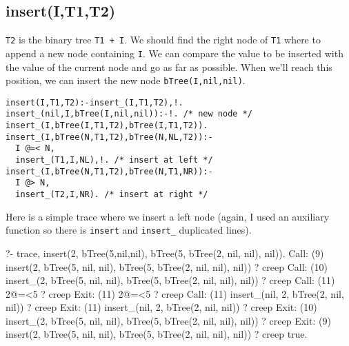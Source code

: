 \documentclass{article}
\begin{document}
  \subsection*{insert(I,T1,T2)}

    \texttt{T2} is the binary tree \texttt{T1 + I}.
    We should find the right node of \texttt{T1} where to append a new node
    containing \texttt{I}. We can compare the value to be inserted with the value of the current node
    and go as far as possible. When we'll reach this position, we can insert the new node \texttt{bTree(I,nil,nil)}.
    \begin{verbatim}
insert(I,T1,T2):-insert_(I,T1,T2),!.
insert_(nil,I,bTree(I,nil,nil)):-!. /* new node */
insert_(I,bTree(I,T1,T2),bTree(I,T1,T2)).
insert_(I,bTree(N,T1,T2),bTree(N,NL,T2)):-
  I @=< N,
  insert_(T1,I,NL),!. /* insert at left */
insert_(I,bTree(N,T1,T2),bTree(N,T1,NR)):-
  I @> N,
  insert_(T2,I,NR). /* insert at right */
    \end{verbatim}

    Here is a simple trace where we insert a left node (again, I used an auxiliary function so there is \texttt{insert} and \texttt{insert_} duplicated lines).
    \begin{myminted}
    ?- trace, insert(2, bTree(5,nil,nil), bTree(5, bTree(2, nil, nil), nil)).
   Call: (9) insert(2, bTree(5, nil, nil), bTree(5, bTree(2, nil, nil), nil)) ? creep
   Call: (10) insert_(2, bTree(5, nil, nil), bTree(5, bTree(2, nil, nil), nil)) ? creep
   Call: (11) 2@=<5 ? creep
   Exit: (11) 2@=<5 ? creep
   Call: (11) insert_(nil, 2, bTree(2, nil, nil)) ? creep
   Exit: (11) insert_(nil, 2, bTree(2, nil, nil)) ? creep
   Exit: (10) insert_(2, bTree(5, nil, nil), bTree(5, bTree(2, nil, nil), nil)) ? creep
   Exit: (9) insert(2, bTree(5, nil, nil), bTree(5, bTree(2, nil, nil), nil)) ? creep
true.
    \end{myminted}
\end{document}
